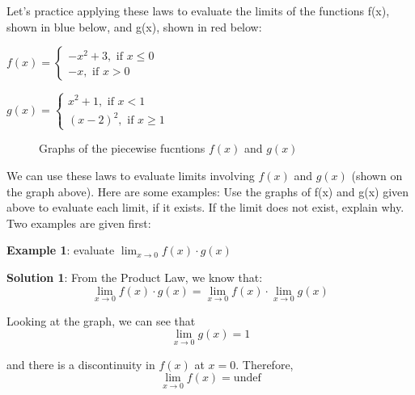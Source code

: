 Let's practice applying these laws to evaluate the limits of the functions f(x), 
shown in blue below, and g(x), shown in red below:

$f(x) = \begin{cases}
    -x^2+3, \text{ if } x \leq 0\\
    -x, \text{ if } x > 0
\end{cases}$

$g(x) = \begin{cases}
   x^2+1, \text{ if } x < 1 \\
    (x-2)^2, \text{ if } x \geq 1
\end{cases}$

\begin{figure}[htbp]
\centering
{}
\caption{Graphs of the piecewise fucntions $f(x)$ and $g(x)$}
\end{figure}
We can use these laws to evaluate limits involving $f(x)$ and $g(x)$ (shown on the 
graph above). Here are some examples:
Use the graphs of f(x) and g(x) given above to evaluate each limit, if it exists. 
If the limit does not exist, explain why. Two examples are given first:

\textbf{Example 1}: evaluate $\lim_{x\to0} f(x) \cdot g(x)$

\textbf{Solution 1}: From the Product Law, we know that:
$$\lim_{x\to0} f(x) \cdot g(x) = \lim_{x\to0}f(x) \cdot \lim_{x\to0} g(x)$$

Looking at the graph, we can see that 
$$\lim_{x\to0}g(x) = 1$$ 

and there is a discontinuity in $f(x)$ at $x=0$. Therefore, 
$$\lim_{x\to0}f(x) = \text{undef}$$

